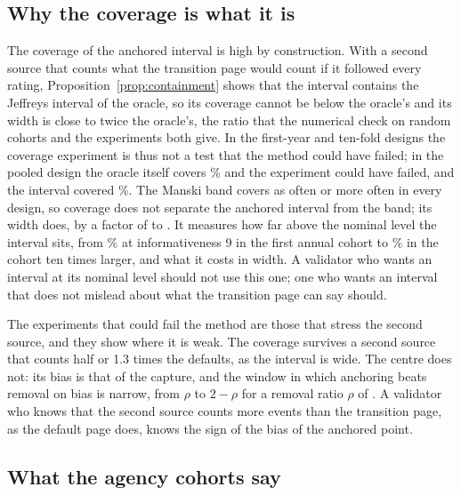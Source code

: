 \subsection{Why the coverage is what it is}

The coverage of the anchored interval is high by construction. With a second source that counts what the transition page would count if it followed every \wdn{} rating, Proposition~\ref{prop:containment} shows that the interval contains the Jeffreys interval of the oracle, so its coverage cannot be below the oracle's and its width is close to twice the oracle's, the ratio that the numerical check on random cohorts and the experiments both give. In the first-year and ten-fold designs the coverage experiment is thus not a test that the method could have failed; in the pooled design the oracle itself covers \% and the experiment could have failed, and the interval covered \%. The Manski band covers as often or more often in every design, so coverage does not separate the anchored interval from the band; its width does, by a factor of  to . It measures how far above the nominal level the interval sits, from \% at informativeness 9 in the first annual cohort to \% in the cohort ten times larger, and what it costs in width. A validator who wants an interval at its nominal level should not use this one; one who wants an interval that does not mislead about what the transition page can say should.

The experiments that could fail the method are those that stress the second source, and they show where it is weak. The coverage survives a second source that counts half or 1.3 times the defaults, as the interval is wide. The centre does not: its bias is that of the capture, and the window in which anchoring beats removal on bias is narrow, from $\rho$ to $2-\rho$ for a removal ratio $\rho$ of . A validator who knows that the second source counts more events than the transition page, as the default page does, knows the sign of the bias of the anchored point.

\subsection{What the agency cohorts say}

